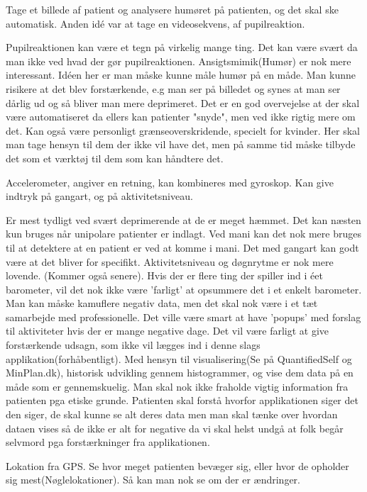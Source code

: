 \begin{description}[style=nextline]
\item[Idé 1] 
    Tage et billede af patient og analysere humøret på patienten, og det skal ske automatisk. Anden idé var at tage en videosekvens, af pupilreaktion. 
    
    Pupilreaktionen kan være et tegn på virkelig mange ting. Det kan være svært da man ikke ved hvad der gør pupilreaktionen. Ansigtsmimik(Humør) er nok mere interessant. Idéen her er man måske kunne måle humør på en måde. Man kunne risikere at det blev forstærkende, e.g man ser på billedet og synes at man ser dårlig ud og så bliver man mere deprimeret. Det er en god overvejelse at der skal være automatiseret da ellers kan patienter "snyde", men ved ikke rigtig mere om det. Kan også være personligt grænseoverskridende, specielt for kvinder. Her skal man tage hensyn til dem der ikke vil have det, men på samme tid måske tilbyde det som et værktøj til dem som kan håndtere det.
\item[Idé 2]
    Accelerometer, angiver en retning, kan kombineres med gyroskop. Kan give indtryk på gangart, og på aktivitetsniveau. 
    
    Er mest tydligt ved svært deprimerende at de er meget hæmmet. Det kan næsten kun bruges når unipolare patienter er indlagt. Ved mani kan det nok mere bruges til at detektere at en patient er ved at komme i mani. Det med gangart kan godt være at det bliver for specifikt. Aktivitetsniveau og døgnrytme er nok mere lovende. (Kommer også senere). Hvis der er flere ting der spiller ind i éet barometer, vil det nok ikke være 'farligt' at opsummere det i et enkelt barometer. Man kan måske kamuflere negativ data, men det skal nok være i et tæt samarbejde med professionelle. Det ville være smart at have 'popups' med forslag til aktiviteter hvis der er mange negative dage. Det vil være farligt at give forstærkende udsagn, som ikke vil lægges ind i denne slags applikation(forhåbentligt). Med hensyn til visualisering(Se på QuantifiedSelf og MinPlan.dk), historisk udvikling gennem histogrammer, og vise dem data på en måde som er gennemskuelig. Man skal nok ikke fraholde vigtig information fra patienten pga etiske grunde. Patienten skal forstå hvorfor applikationen siger det den siger, de skal kunne se alt deres data men man skal tænke over hvordan dataen vises så de ikke er alt for negative da vi skal helst undgå at folk begår selvmord pga forstærkninger fra applikationen.
\item[Idé 3]
    Lokation fra GPS. Se hvor meget patienten bevæger sig, eller hvor de opholder sig mest(Nøglelokationer). Så kan man nok se om der er ændringer. 
    

\end{description}
